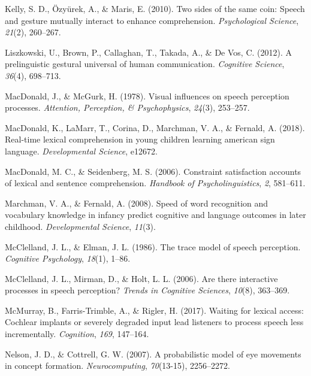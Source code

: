 \documentclass[english,floatsintext,man]{apa6}
\begin{document}
\leavevmode\hypertarget{ref-kelly2010two}{}%
Kelly, S. D., Özyürek, A., \& Maris, E. (2010). Two sides of the same
coin: Speech and gesture mutually interact to enhance comprehension.
\emph{Psychological Science}, \emph{21}(2), 260--267.

\leavevmode\hypertarget{ref-liszkowski2012prelinguistic}{}%
Liszkowski, U., Brown, P., Callaghan, T., Takada, A., \& De Vos, C.
(2012). A prelinguistic gestural universal of human communication.
\emph{Cognitive Science}, \emph{36}(4), 698--713.

\leavevmode\hypertarget{ref-macdonald1978visual}{}%
MacDonald, J., \& McGurk, H. (1978). Visual influences on speech
perception processes. \emph{Attention, Perception, \& Psychophysics},
\emph{24}(3), 253--257.

\leavevmode\hypertarget{ref-macdonald2018real}{}%
MacDonald, K., LaMarr, T., Corina, D., Marchman, V. A., \& Fernald, A.
(2018). Real-time lexical comprehension in young children learning
american sign language. \emph{Developmental Science}, e12672.

\leavevmode\hypertarget{ref-macdonald2006constraint}{}%
MacDonald, M. C., \& Seidenberg, M. S. (2006). Constraint satisfaction
accounts of lexical and sentence comprehension. \emph{Handbook of
Psycholinguistics}, \emph{2}, 581--611.

\leavevmode\hypertarget{ref-marchman2008speed}{}%
Marchman, V. A., \& Fernald, A. (2008). Speed of word recognition and
vocabulary knowledge in infancy predict cognitive and language outcomes
in later childhood. \emph{Developmental Science}, \emph{11}(3).

\leavevmode\hypertarget{ref-mcclelland1986trace}{}%
McClelland, J. L., \& Elman, J. L. (1986). The trace model of speech
perception. \emph{Cognitive Psychology}, \emph{18}(1), 1--86.

\leavevmode\hypertarget{ref-mcclelland2006there}{}%
McClelland, J. L., Mirman, D., \& Holt, L. L. (2006). Are there
interactive processes in speech perception? \emph{Trends in Cognitive
Sciences}, \emph{10}(8), 363--369.

\leavevmode\hypertarget{ref-mcmurray2017waiting}{}%
McMurray, B., Farris-Trimble, A., \& Rigler, H. (2017). Waiting for
lexical access: Cochlear implants or severely degraded input lead
listeners to process speech less incrementally. \emph{Cognition},
\emph{169}, 147--164.

\leavevmode\hypertarget{ref-nelson2007probabilistic}{}%
Nelson, J. D., \& Cottrell, G. W. (2007). A probabilistic model of eye
movements in concept formation. \emph{Neurocomputing}, \emph{70}(13-15),
2256--2272.
\end{document}
